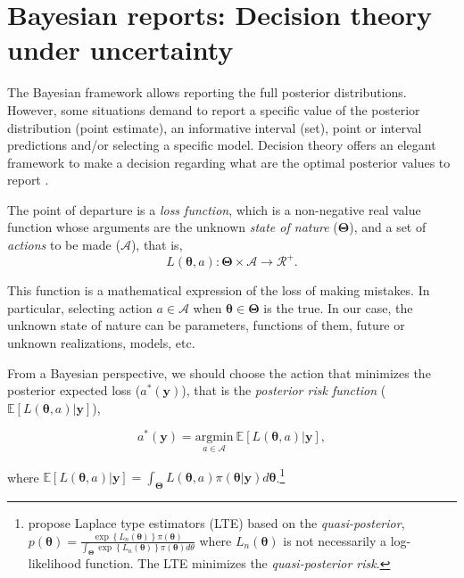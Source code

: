 \section{Bayesian reports: Decision theory under uncertainty}\label{sec14}

The Bayesian framework allows reporting the full posterior distributions. However, some situations demand to report a specific value of the posterior distribution (point estimate), an informative interval (set), point or interval predictions and/or selecting a specific model. Decision theory offers an elegant framework to make a decision regarding what are the optimal posterior values to report \cite{berger2013statistical}.

The point of departure is a \textit{loss function}, which is a non-negative real value function whose arguments are the unknown \textit{state of nature} ($\mathbf{\Theta}$), and a set of \textit{actions} to be made ($\mathcal{A}$), that is, 
\begin{equation*}
	L(\mathbf{\theta}, a):\mathbf{\Theta}\times \mathcal{A}\rightarrow \mathcal{R}^+.
\end{equation*}

This function is a mathematical expression of the loss of making mistakes. In particular, selecting action $a\in\mathcal{A}$ when $\mathbf{\theta}\in\mathbf{\Theta}$ is the true. In our case, the unknown state of nature can be parameters, functions of them, future or unknown realizations, models, etc.

From a Bayesian perspective, we should choose the action that minimizes the posterior expected loss ($a^*(\mathbf{y})$), that is the \textit{posterior risk function} ($\mathbb{E}[L(\mathbf{\theta}, a)|\mathbf{y}]$),

\begin{equation*}
	a^*(\mathbf{y})=\underset{a \in \mathcal{A}}{\mathrm{argmin}} \  \mathbb{E}[L(\mathbf{\theta}, a)|\mathbf{y}], 
\end{equation*}

where $\mathbb{E}[L(\mathbf{\theta}, a)|\mathbf{y}]= \int_{\mathbf{\Theta}} L(\mathbf{\theta}, a)\pi(\mathbf{\theta}|\mathbf{y})d\mathbf{\theta}$.\footnote{\cite{Chernozhukov2003} propose Laplace type estimators (LTE) based on the \textit{quasi-posterior}, $p(\mathbf{\theta})=\frac{\exp\left\{L_n(\mathbf{\theta})\right\}\pi(\mathbf{\theta})}{\int_{\mathbf{\Theta}}\exp\left\{L_n(\mathbf{\theta})\right\}\pi(\mathbf{\theta})d\theta}$ where $L_n(\mathbf{\theta})$ is not necessarily a log-likelihood function. The LTE minimizes the \textit{quasi-posterior risk}.}

